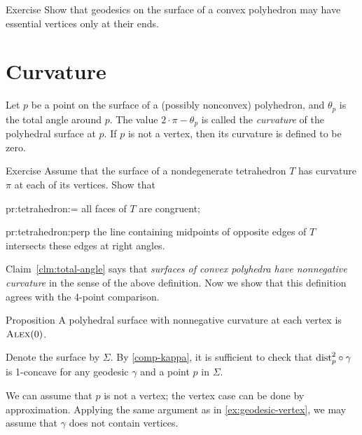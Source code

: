 \begin{thm}{Exercise}\label{ex:geodesic-vertex}
Show that geodesics on the surface of a convex polyhedron may have essential vertices only at their ends.
\end{thm}

\section{Curvature}

Let $p$ be a point on the surface of a (possibly nonconvex) polyhedron, and $\theta_p$ is the total angle around $p$.
The value $2\cdot \pi -\theta_p$ is called the \emph{curvature} of the polyhedral surface at $p$.
If $p$ is not a vertex, then its curvature is defined to be zero.

\begin{thm}{Exercise}\label{pr:tetrahedron} 
Assume that the surface of a nondegenerate tetrahedron $T$ has curvature $\pi$ at each of its vertices.
Show that 

\begin{subthm}{pr:tetrahedron:=}
all faces of $T$ are congruent; 
\end{subthm}

\begin{subthm}{pr:tetrahedron:perp} the line containing midpoints of opposite edges of $T$ intersects these edges at right angles.
\end{subthm}
 
\end{thm}

Claim~\ref{clm:total-angle} says that \textit{surfaces of convex polyhedra have nonnegative curvature} in the sense of the above definition.
Now we show that this definition agrees with the 4-point comparison.

\begin{thm}{Proposition}\label{prop:poly-CBB}
A polyhedral surface with nonnegative curvature at each vertex is $\textsc{Alex}(0)$.
\end{thm}

Denote the surface by $\Sigma$.
By \ref{comp-kappa}, it is sufficient to check that 
$\mathrm{dist}_p^2\circ\gamma$ is 1-concave for any geodesic $\gamma$ and a point $p$ in $\Sigma$.

We can assume that $p$ is not a vertex;
the vertex case can be done by approximation.
Applying the same argument as in \ref{ex:geodesic-vertex}, we may assume that $\gamma$ does not contain vertices.

